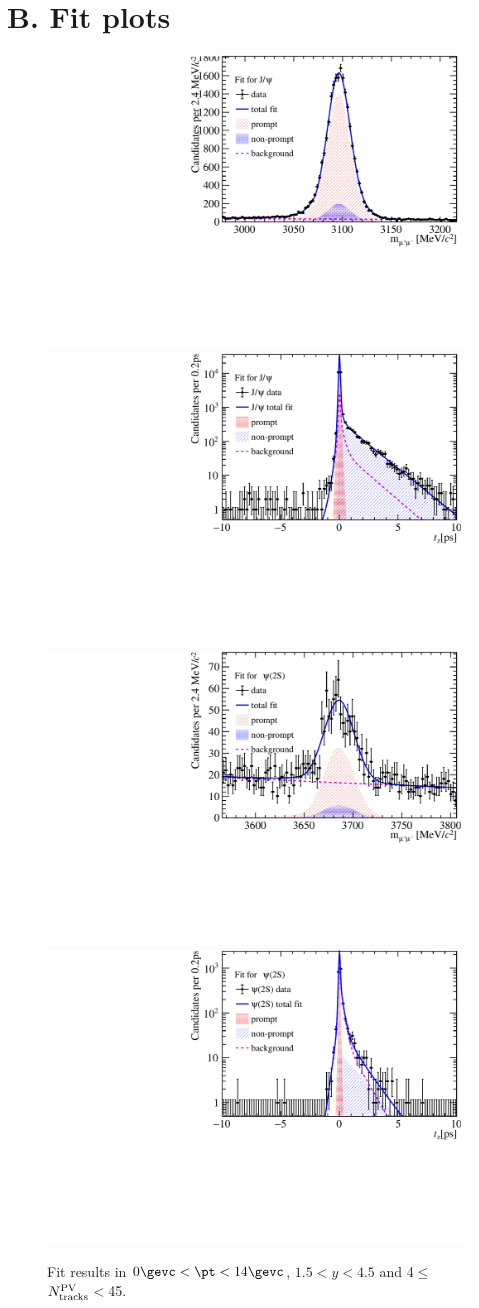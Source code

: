 \clearpage
\section*{B. Fit plots}
\label{Fit plots}
\begin{figure}[H]
\begin{center}
\includegraphics[width=0.45\linewidth]{pdf/pPb/Workdir/TwoDimFit/ProjMass/Jpsi_n1y1pt1.pdf}
\includegraphics[width=0.45\linewidth]{pdf/pPb/Workdir/TwoDimFit/ProjTz/Jpsi_n1y1pt1.pdf}
\vspace*{-0.5cm}
\includegraphics[width=0.45\linewidth]{pdf/pPb/Workdir/TwoDimFit/ProjMass/Psi2S_n1y1pt1.pdf}
\includegraphics[width=0.45\linewidth]{pdf/pPb/Workdir/TwoDimFit/ProjTz/Psi2S_n1y1pt1.pdf}
\vspace*{-0.5cm}
\end{center}
\caption{Fit results in $0\gevc<\pt<14\gevc$, $1.5<y<4.5$ and 4$\leq$$N^{\rm PV}_{\rm tracks}$$<$45.}
\end{figure}
